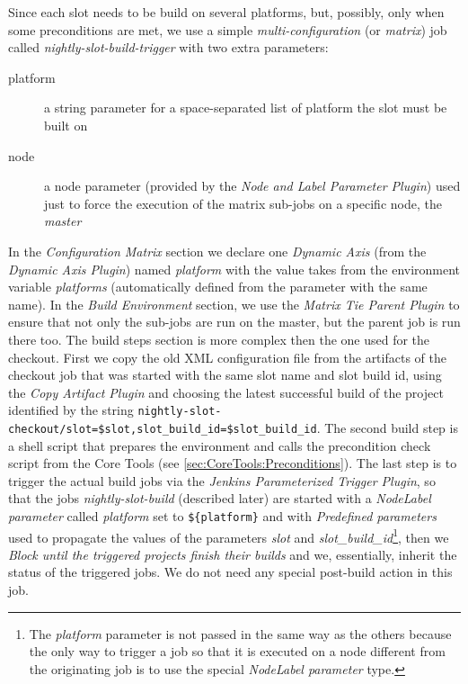 Since each slot needs to be build on several platforms, but, possibly, only when
some preconditions are met, we use a simple \emph{multi-configuration} (or
\emph{matrix}) job called \emph{nightly-slot-build-trigger} with two extra
parameters:
\begin{description}
  \item[platform] a string parameter for a space-separated list of platform the
slot must be built on
  \item[node] a node parameter (provided by the \emph{Node and Label Parameter
Plugin}) used just to force the execution of the matrix sub-jobs on a specific
node, the \emph{master}
\end{description}
In the \emph{Configuration Matrix} section we declare one \emph{Dynamic Axis}
(from the \emph{Dynamic Axis Plugin}) named \emph{platform} with the value takes
from the environment variable \emph{platforms} (automatically defined from the
parameter with the same name).  In the \emph{Build Environment} section, we use
the \emph{Matrix Tie Parent Plugin} to ensure that not only the sub-jobs are run
on the master, but the parent job is run there too.  The build steps section is
more complex then the one used for the checkout.  First we copy the old XML
configuration file from the artifacts of the checkout job that was started with
the same slot name and slot build id, using the \emph{Copy Artifact Plugin} and
choosing the latest successful build of the project identified by the string
\verb|nightly-slot-checkout/slot=$slot,slot_build_id=$slot_build_id|.  The
second build step is a shell script that prepares the environment and calls the
precondition check script from the Core Tools (see
\ref{sec:CoreTools:Preconditions}).  The last step is to trigger the actual build
jobs via the \emph{Jenkins Parameterized Trigger Plugin}, so that the jobs
\emph{nightly-slot-build} (described later) are started with a \emph{NodeLabel
parameter} called \emph{platform} set to \verb|${platform}| and with
\emph{Predefined parameters} used to propagate the values of the parameters
\emph{slot} and \emph{slot\_build\_id}\footnote{The \emph{platform} parameter is
  not passed in the same way as the others because the only way to trigger a job
  so that it is executed on a node different from the originating job is to use
  the special \emph{NodeLabel parameter} type.},
then we \emph{Block until the triggered projects finish their builds} and we,
essentially, inherit the status of the triggered jobs.  We do not need any
special post-build action in this job.

